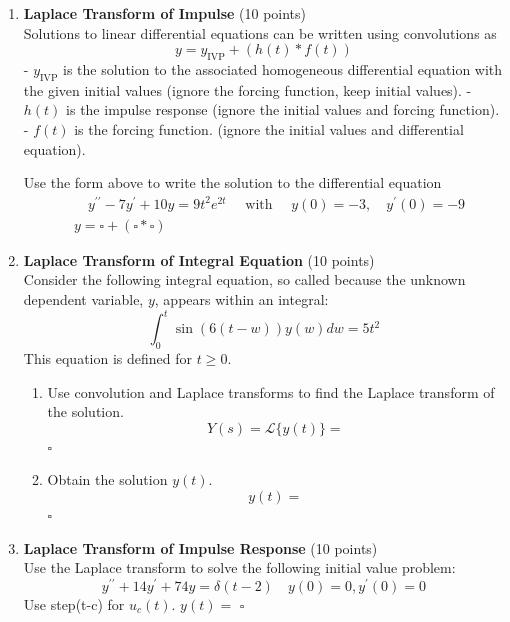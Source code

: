 \begin{enumerate}
  \newpage
  \item \textbf{Laplace Transform of Impulse} (10 points)\\
  Solutions to linear differential equations can be written using convolutions as
  $$
  y=y_{\mathrm{IVP}}+(h(t) * f(t))
  $$
  - $y_{\mathrm{IVP}}$ is the solution to the associated homogeneous differential equation with the given initial values
  (ignore the forcing function, keep initial values).
  - $h(t)$ is the impulse response
  (ignore the initial values and forcing function).
  - $f(t)$ is the forcing function.
  (ignore the initial values and differential equation).

  Use the form above to write the solution to the differential equation
  $$
  \begin{aligned}
  & \quad y^{\prime \prime}-7 y^{\prime}+10 y=9 t^2 e^{2 t} \quad \text { with } \quad y(0)=-3, \quad y^{\prime}(0)=-9 \\
  & y=\square+(\square * \square)
  \end{aligned}
  $$
  \begin{subanswer}
  \end{subanswer}

  \item \textbf{Laplace Transform of Integral Equation} (10 points)\\
  Consider the following integral equation, so called because the unknown dependent variable, $y$, appears within an integral:
  $$
  \int_0^t \sin (6(t-w)) y(w) d w=5 t^2
  $$
  This equation is defined for $t \geq 0$.
  \begin{enumerate}[label=(\alph*)]
    \item Use convolution and Laplace transforms to find the Laplace transform of the solution.
    $$
    Y(s)=\mathcal{L}\{y(t)\}=
    $$
    $\square$
    \begin{subanswer}
    \end{subanswer}
    \item Obtain the solution $y(t)$.
    $$
    y(t)=
    $$
    $\square$
    \begin{subanswer}
    \end{subanswer}
  \end{enumerate}

  \item \textbf{Laplace Transform of Impulse Response} (10 points)\\
  Use the Laplace transform to solve the following initial value problem:
  $$
  y^{\prime \prime}+14 y^{\prime}+74 y=\delta(t-2) \quad y(0)=0, y^{\prime}(0)=0
  $$
  Use step(t-c) for $u_c(t)$. $y(t)=$ $\square$
  \begin{subanswer}
  \end{subanswer}


\end{enumerate}
